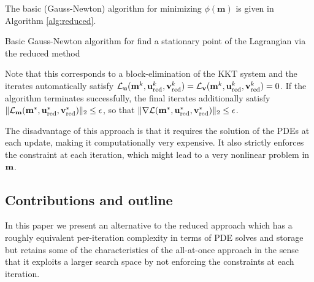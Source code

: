 \documentclass{iopart}
\begin{document}
The basic (Gauss-Newton) algorithm for minimizing $\phi(\mathbf{m})$ is given in 
Algorithm \ref{alg:reduced}.
\begin{algorithm}
\caption{Basic Gauss-Newton algorithm for find a stationary point of the Lagrangian via the reduced method}
\label{alg:reduced}
\begin{algorithmic}
\REPEAT
{}
\end{algorithmic}
\end{algorithm}
Note that this corresponds to a block-elimination of the KKT system and the iterates automatically
satisfy $\mathcal{L}_{\mathbf{u}}(\mathbf{m}^k,\mathbf{u}^k_{\mathrm{red}},\mathbf{v}^k_{\mathrm{red}}) = \mathcal{L}_{\mathbf{v}}(\mathbf{m}^k,\mathbf{u}^k_{\mathrm{red}},\mathbf{v}^k_{\mathrm{red}}) = 0$. 
If the algorithm terminates successfully, the final iterates additionally satisfy
$\|\mathcal{L}_{\mathbf{m}}(\mathbf{m}^*,\mathbf{u}^*_{\mathrm{red}},\mathbf{v}^*_{\mathrm{red}})\|_2 \leq \epsilon$, so that 
$\|\nabla\mathcal{L}(\mathbf{m}^*,\mathbf{u}^*_{\mathrm{red}},\mathbf{v}^*_{\mathrm{red}})\|_2\leq \epsilon$.

The disadvantage of this approach is that it
requires the solution of the PDEs at each update, making it computationally very expensive. 
It also strictly enforces the constraint at each iteration, which might lead to a very
nonlinear problem in $\mathbf{m}$. 

\subsection{Contributions and outline}
In this paper we present an alternative to the reduced approach which
has a roughly equivalent per-iteration complexity in terms of PDE solves
and storage but retains some of the characteristics of the all-at-once
approach in the sense that it exploits a larger search space by not
enforcing the constraints at each iteration.
\end{document}

